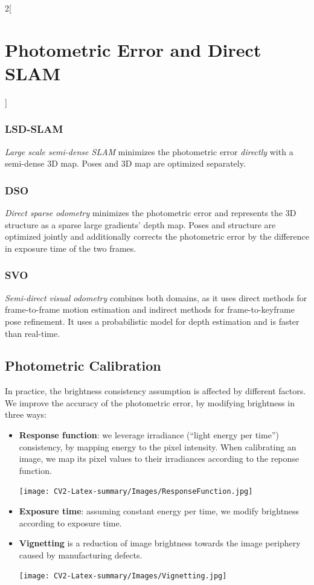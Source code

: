 \documentclass[oneside,fontsize=11pt,paper=a4]{scrartcl}
\begin{document}
\begin{multicols}{2}[\section{Photometric Error and Direct SLAM}]
\subsubsection{LSD-SLAM} \textit{Large scale semi-dense SLAM} minimizes the photometric error \textit{directly} with a semi-dense 3D map. Poses and 3D map are optimized separately. 

\subsubsection{DSO}

\textit{Direct sparse odometry} minimizes the photometric error and represents the 3D structure as a sparse large gradients' depth map. Poses and structure are optimized jointly and additionally corrects the photometric error by the difference in exposure time of the two frames.

\subsubsection{SVO}

\textit{Semi-direct visual odometry} combines both domains, as it uses direct methods for frame-to-frame motion estimation and indirect methods for frame-to-keyframe pose refinement. It uses a probabilistic model for depth estimation and is faster than real-time. 

\subsection{Photometric Calibration} In practice, the brightness consistency assumption is affected by different factors. We improve the accuracy of the photometric error, by modifying brightness in three ways:
\begin{itemize}
    \item \textbf{Response function}: we leverage irradiance (``light energy per time'') consistency, by mapping energy to the pixel intensity. When calibrating an image, we map its pixel values to their irradiances according to the reponse function.
    \begin{center}
        \texttt{[image: CV2-Latex-summary/Images/ResponseFunction.jpg]}
    \end{center}
    \item \textbf{Exposure time}: assuming constant energy per time, we modify brightness according to exposure time.
    \item \textbf{Vignetting} is a reduction of image brightness towards the image periphery caused by manufacturing defects. 
    \begin{center}
        \texttt{[image: CV2-Latex-summary/Images/Vignetting.jpg]}
    \end{center}
\end{itemize}

\end{multicols}
\newpage
\end{document}
